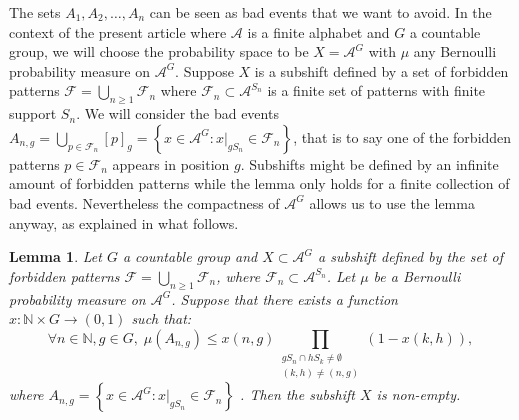 \documentclass[letterpaper]{article}
\theoremstyle{plain}
\newtheorem{lemma}[theorem]{Lemma}
\def\NN{\mathbb{N}}
\def\ag{\mathcal{A}}
\def\FF{\mathcal{F}}
\newcommand{\cor}[2][]{#2}
\begin{document}
	The sets $A_1,A_2,\dots,A_n$ can be seen as bad events that we want to avoid. In the context of the present article where $\ag$ is a finite alphabet and $G$ a countable group, we will choose the probability space to be $X=\ag^G$ with $\mu$ any Bernoulli probability measure on $\ag^G$. Suppose $X$ is a subshift defined by a set of forbidden patterns $\FF= \bigcup_{n \geq 1}\FF_n$ where $\FF_n \subset \ag^{S_n}$ is a finite set of patterns with \cor[a]{} finite support $S_n$. We will consider the bad events $A_{n,g}= \bigcup_{p \in \FF_n}[p]_g = \left\{ x\in\ag^G: x|_{gS_n} \in \FF_n \right\}$, that is to say one of the forbidden patterns $p \in \FF_n$ appears in position $g$. Subshifts might be defined by an infinite amount of forbidden patterns while the lemma only holds for a finite collection of bad events. Nevertheless the compactness of $\ag^G$ allows us to use the lemma anyway, as explained in what follows.
	
	\begin{lemma}
		\label{corollary.LLL_nonemptiness} 
		Let $G$ a countable group and $X\subset \ag^G$ a subshift defined by the set of forbidden patterns $\FF= \bigcup_{n \geq 1}\FF_n$, where $\FF_n \subset \ag^{S_n}$. \cor{Let $\mu$ be a Bernoulli probability measure on $\ag^G$.} Suppose that there exists a function $x: \NN\times G \to (0,1)$ such that:
		\begin{equation}\label{eq.condition_LLL}\tag{$*$}
		\forall n\in\NN, g\in G,\; \mu(A_{n,g})\leq x(n,g)\prod_{\substack{gS_n\cap hS_k\neq\emptyset\\ (k,h) \neq (n,g)}}(1-x(k,h)),
		\end{equation}
		where $A_{n,g}=\left\{ x\in\ag^G: x|_{gS_n} \in \FF_n \right\}$ \cor[and $\mu$ is any Bernoulli probability measure on $\ag^G$]{}. Then the subshift $X$ is non-empty. 
	\end{lemma}
	
\end{document}
